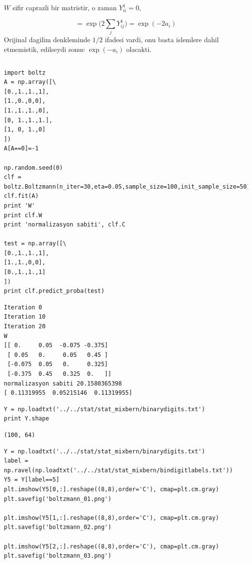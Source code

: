 \documentclass[12pt,fleqn]{article}\usepackage{../common}
\begin{document}
$W$ sifir caprazli bir matristir, o zaman $Y_{ii}^1=0$, 

$$ 
= \exp \big( 2 \sum_{j} Y_{ij}^1 \big) = \exp (- 2 a_i )
 $$
Orijinal dagilim denkleminde $1/2$ ifadesi vardi, onu basta islemlere dahil
etmemistik, edilseydi sonuc  $\exp (- a_i)$ olacakti. 

\inputminted[fontsize=\footnotesize]{python}{boltz.py}



\begin{verbatim}
import boltz
A = np.array([\
[0.,1.,1.,1],
[1.,0.,0,0],
[1.,1.,1.,0],
[0, 1.,1.,1.],
[1, 0, 1.,0]
])
A[A==0]=-1

np.random.seed(0)
clf = boltz.Boltzmann(n_iter=30,eta=0.05,sample_size=100,init_sample_size=50)
clf.fit(A)
print 'W'
print clf.W
print 'normalizasyon sabiti', clf.C

test = np.array([\
[0.,1.,1.,1],
[1.,1.,0,0],
[0.,1.,1.,1]
])    
print clf.predict_proba(test)
\end{verbatim}

\begin{verbatim}
Iteration 0
Iteration 10
Iteration 20
W
[[ 0.     0.05  -0.075 -0.375]
 [ 0.05   0.     0.05   0.45 ]
 [-0.075  0.05   0.     0.325]
 [-0.375  0.45   0.325  0.   ]]
normalizasyon sabiti 20.1580365398
[ 0.11319955  0.05215146  0.11319955]
\end{verbatim}

\begin{verbatim}
Y = np.loadtxt('../../stat/stat_mixbern/binarydigits.txt')
print Y.shape
\end{verbatim}

\begin{verbatim}
(100, 64)
\end{verbatim}


\begin{verbatim}
Y = np.loadtxt('../../stat/stat_mixbern/binarydigits.txt')
label = np.ravel(np.loadtxt('../../stat/stat_mixbern/bindigitlabels.txt'))
Y5 = Y[label==5]
plt.imshow(Y5[0,:].reshape((8,8),order='C'), cmap=plt.cm.gray)
plt.savefig('boltzmann_01.png')

plt.imshow(Y5[1,:].reshape((8,8),order='C'), cmap=plt.cm.gray)
plt.savefig('boltzmann_02.png')

plt.imshow(Y5[2,:].reshape((8,8),order='C'), cmap=plt.cm.gray)
plt.savefig('boltzmann_03.png')
\end{verbatim}
\end{document}
